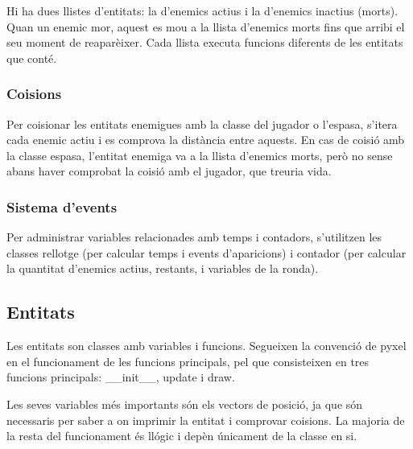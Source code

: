Hi ha dues llistes d'entitats:
la d'enemics actius i la d'enemics inactius (morts).
Quan un enemic mor, aquest es mou a la llista d'enemics morts
fins que arribi el seu moment de reapar\`eixer.
Cada llista executa funcions diferents de les entitats que cont\'e.

\subsubsection{Co\lgem isions}
Per co\lgem isionar les entitats enemigues amb la classe del jugador o l'espasa,
s'itera cada enemic actiu i es comprova la dist\`ancia entre aquests.
En cas de co\lgem isi\'o amb la classe espasa,
l'entitat enemiga va a la llista d'enemics morts,
per\`o no sense abans haver comprobat la co\lgem isi\'o amb el jugador,
que treuria vida.

\subsubsection{Sistema d'events}
Per administrar variables relacionades amb temps i contadors,
s'utilitzen les classes rellotge
(per calcular temps i events d'aparicions)
i contador
(per calcular la quantitat d'enemics actius, restants, i variables de la ronda).



\subsection{Entitats}
Les entitats son classes amb variables i funcions.
Segueixen la convenci\'o de pyxel en el funcionament de les funcions principals,
pel que consisteixen en tres funcions principals:
\_\_init\_\_, update i draw.

Les seves variables m\'es importants s\'on els vectors de posici\'o,
ja que s\'on necessaris per saber a on imprimir la entitat
i comprovar co\lgem isions.
La majoria de la resta del funcionament \'es ll\'ogic i dep\`en \'unicament
de la classe en si.
